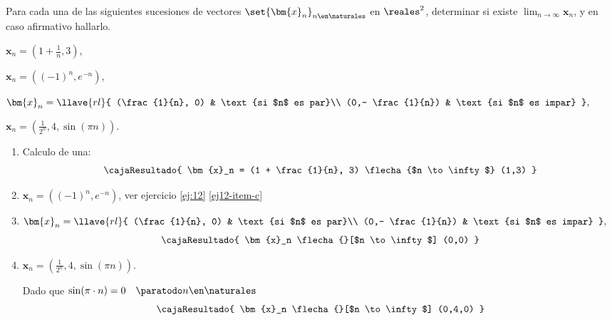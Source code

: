 \begin{enunciado}{\ejercicio}
  Para cada una de las siguientes sucesiones de vectores $\set{\bm{x}_n}_{n\en\naturales}$ en $\reales^2$,
  determinar si existe $\lim_{n \to \infty} \bm{x}_n$, y en caso afirmativo hallarlo.
  \begin{enumerate}[label=\alph*)]
    \begin{multicols}{2}
      \item $\bm{x}_n = (1 + \frac{1}{n}, 3)$,

      \item $\bm{x}_n = ((-1)^n, e^{-n})$,

      \item $\bm{x}_n =
        \llave{rl}{
          (\frac{1}{n}, 0) & \text{si $n$ es par}\\
          (0,- \frac{1}{n}) & \text{si $n$ es impar}
        },
      $

      \item $
        \bm{x}_n = (\frac{1}{2^n}, 4, \sin(\pi n)).
      $
    \end{multicols}
  \end{enumerate}
\end{enunciado}

{\huge{}}

\begin{enumerate}[label=\alph*)]
  \item Calculo de una:
        $$
          \cajaResultado{
            \bm{x}_n = (1 + \frac{1}{n}, 3) \flecha{$n \to \infty$} (1,3)
          }
        $$

  \item $\bm{x}_n = ((-1)^n, e^{-n})$,  ver ejercicio \ref{ej:12} \ref{ej12-item-c}

  \item $\bm{x}_n =
          \llave{rl}{
            (\frac{1}{n}, 0) & \text{si $n$ es par}\\
            (0,- \frac{1}{n}) & \text{si $n$ es impar}
          },
        $
        $$
          \cajaResultado{
            \bm{x}_n \flecha{}[$n \to \infty$] (0,0)
          }
        $$

  \item $
          \bm{x}_n = (\frac{1}{2^n}, 4, \sin(\pi n)).
        $

        Dado que $\sin(\pi \cdot n) = 0 \quad \paratodo n \en \naturales$
        $$
          \cajaResultado{
            \bm{x}_n \flecha{}[$n \to \infty$] (0,4,0)
          }
        $$
\end{enumerate}

\begin{aportes}
  \item {}
\end{aportes}
